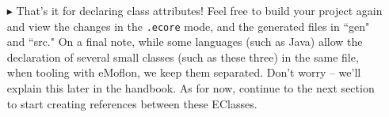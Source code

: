 \begin{itemize}
\vspace{0.5cm}

\item[$\blacktriangleright$] That's it for declaring class attributes! Feel free to build your project again and view the changes in the \texttt{.ecore}
mode, and the generated files in ``gen" and ``src." On a final note, while some languages (such as Java) allow the declaration of several small classes (such as
these three) in the same file, when tooling with eMoflon, we keep them separated. Don't worry -- we'll explain this later in the handbook. As for now, continue
to the next section to start creating references between these EClasses.

\end{itemize}
